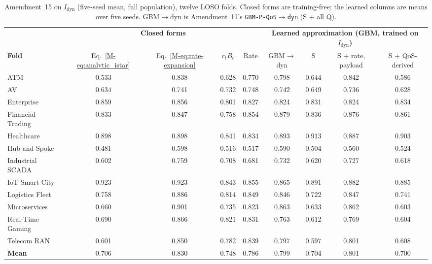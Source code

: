 \begin{table}[htbp]
\centering
\scriptsize
\caption{Amendment~15 on $I_{\text{dyn}}$ (five-seed mean, full population), twelve LOSO folds. Closed forms are training-free; the learned columns are means over five seeds. GBM$\to$dyn is Amendment~11's \texttt{GBM-P-QoS$\to$dyn} (S + all Q).}
\label{tab:a15-folds}
\begin{tabular}{lcccc|cccc}
\toprule
 & \multicolumn{4}{c|}{\textbf{Closed forms}} & \multicolumn{4}{c}{\textbf{Learned approximation (GBM, trained on $I_{\text{dyn}}$)}} \\
\textbf{Fold} & Eq.~\eqref{M-eq:analytic_istar} & Eq.~\eqref{M-eq:rate-expansion} & $r_t B_t$ & Rate & GBM$\to$dyn & S & S + rate, payload & S + QoS-derived \\
\midrule
ATM & 0.533 & 0.838 & 0.628 & 0.770 & 0.798 & 0.644 & 0.842 & 0.586 \\
AV & 0.634 & 0.741 & 0.732 & 0.748 & 0.742 & 0.649 & 0.736 & 0.628 \\
Enterprise & 0.859 & 0.856 & 0.801 & 0.827 & 0.824 & 0.831 & 0.824 & 0.834 \\
Financial Trading & 0.833 & 0.847 & 0.758 & 0.854 & 0.879 & 0.836 & 0.876 & 0.861 \\
Healthcare & 0.898 & 0.898 & 0.841 & 0.834 & 0.893 & 0.913 & 0.887 & 0.903 \\
Hub-and-Spoke & 0.481 & 0.598 & 0.516 & 0.517 & 0.590 & 0.504 & 0.560 & 0.524 \\
Industrial SCADA & 0.602 & 0.759 & 0.708 & 0.681 & 0.732 & 0.620 & 0.727 & 0.618 \\
IoT Smart City & 0.923 & 0.923 & 0.843 & 0.855 & 0.865 & 0.891 & 0.882 & 0.885 \\
Logistics Fleet & 0.758 & 0.886 & 0.814 & 0.849 & 0.846 & 0.722 & 0.847 & 0.741 \\
Microservices & 0.660 & 0.901 & 0.735 & 0.823 & 0.863 & 0.633 & 0.862 & 0.603 \\
Real-Time Gaming & 0.690 & 0.866 & 0.821 & 0.831 & 0.763 & 0.612 & 0.769 & 0.604 \\
Telecom RAN & 0.601 & 0.850 & 0.782 & 0.839 & 0.797 & 0.597 & 0.801 & 0.608 \\
\midrule
\textbf{Mean} & 0.706 & 0.830 & 0.748 & 0.786 & 0.799 & 0.704 & 0.801 & 0.700 \\
\bottomrule
\end{tabular}
\end{table}

